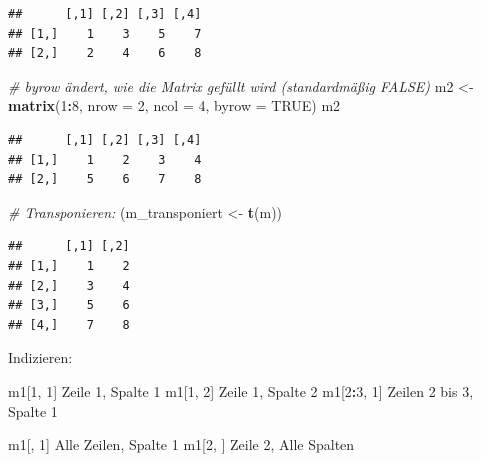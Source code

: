 \documentclass[
]{article}
\newenvironment{Shaded}{\begin{snugshade}}{\end{snugshade}}
\newcommand{\AttributeTok}[1]{\textcolor[rgb]{0.13,0.29,0.53}{#1}}
\newcommand{\CommentTok}[1]{\textcolor[rgb]{0.56,0.35,0.01}{\textit{#1}}}
\newcommand{\ConstantTok}[1]{\textcolor[rgb]{0.56,0.35,0.01}{#1}}
\newcommand{\DecValTok}[1]{\textcolor[rgb]{0.00,0.00,0.81}{#1}}
\newcommand{\FunctionTok}[1]{\textcolor[rgb]{0.13,0.29,0.53}{\textbf{#1}}}
\newcommand{\NormalTok}[1]{#1}
\newcommand{\OtherTok}[1]{\textcolor[rgb]{0.56,0.35,0.01}{#1}}
\newcommand{\SpecialCharTok}[1]{\textcolor[rgb]{0.81,0.36,0.00}{\textbf{#1}}}
\begin{document}
\begin{verbatim}
##      [,1] [,2] [,3] [,4]
## [1,]    1    3    5    7
## [2,]    2    4    6    8
\end{verbatim}

\begin{Shaded}
\begin{Highlighting}[]
\CommentTok{\# byrow ändert, wie die Matrix gefüllt wird (standardmäßig FALSE)}
\NormalTok{m2 }\OtherTok{\textless{}{-}} \FunctionTok{matrix}\NormalTok{(}\DecValTok{1}\SpecialCharTok{:}\DecValTok{8}\NormalTok{, }\AttributeTok{nrow =} \DecValTok{2}\NormalTok{, }\AttributeTok{ncol =} \DecValTok{4}\NormalTok{, }\AttributeTok{byrow =} \ConstantTok{TRUE}\NormalTok{)}
\NormalTok{m2}
\end{Highlighting}
\end{Shaded}

\begin{verbatim}
##      [,1] [,2] [,3] [,4]
## [1,]    1    2    3    4
## [2,]    5    6    7    8
\end{verbatim}

\begin{Shaded}
\begin{Highlighting}[]
\CommentTok{\# Transponieren:}
\NormalTok{(m\_transponiert }\OtherTok{\textless{}{-}} \FunctionTok{t}\NormalTok{(m))}
\end{Highlighting}
\end{Shaded}

\begin{verbatim}
##      [,1] [,2]
## [1,]    1    2
## [2,]    3    4
## [3,]    5    6
## [4,]    7    8
\end{verbatim}

Indizieren:

\begin{Shaded}
\begin{Highlighting}[]
\NormalTok{m1[}\DecValTok{1}\NormalTok{, }\DecValTok{1}\NormalTok{]                Zeile }\DecValTok{1}\NormalTok{, Spalte }\DecValTok{1}
\NormalTok{m1[}\DecValTok{1}\NormalTok{, }\DecValTok{2}\NormalTok{]                Zeile }\DecValTok{1}\NormalTok{, Spalte }\DecValTok{2}
\NormalTok{m1[}\DecValTok{2}\SpecialCharTok{:}\DecValTok{3}\NormalTok{, }\DecValTok{1}\NormalTok{]              Zeilen }\DecValTok{2}\NormalTok{ bis }\DecValTok{3}\NormalTok{, Spalte }\DecValTok{1}

\NormalTok{m1[, }\DecValTok{1}\NormalTok{]                 Alle Zeilen, Spalte }\DecValTok{1}
\NormalTok{m1[}\DecValTok{2}\NormalTok{, ]                 Zeile }\DecValTok{2}\NormalTok{, Alle Spalten}
\end{Highlighting}
\end{Shaded}
\end{document}
